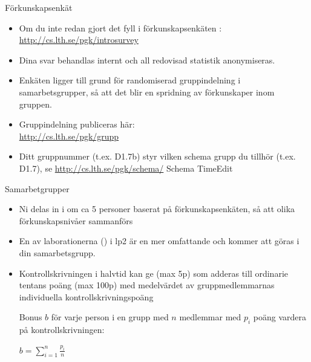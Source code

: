 \begin{SlideExtra}{Förkunskapsenkät}
\begin{itemize}
\item Om du inte redan gjort det fyll i förkunskapsenkäten :
\url{http://cs.lth.se/pgk/introsurvey}
\item Dina svar behandlas internt och all redovisad statistik anonymiseras.
\item Enkäten ligger till grund för randomiserad gruppindelning i samarbetsgrupper, så att det blir en spridning av förkunskaper inom gruppen.
\item Gruppindelning publiceras här: \\ \url{http://cs.lth.se/pgk/grupp}
\item Ditt gruppnummer (t.ex. D1.7b) styr vilken schema grupp du tillhör (t.ex. D1.7), se \url{http://cs.lth.se/pgk/schema/} Schema TimeEdit
\end{itemize}
\end{SlideExtra}

\begin{SlideExtra}{Samarbetgrupper}\footnotesize
\begin{itemize}
\item Ni delas in i  om ca 5 personer baserat på förkunskapsenkäten, så att olika förkunskapsnivåer sammanförs
\item En av laborationerna () i lp2 är en mer omfattande  och kommer att göras i din samarbetsgrupp. \\ \vspace{1em}
\item Kontrollskrivningen i halvtid kan ge  (max 5p) som adderas till ordinarie tentans poäng (max 100p) med medelvärdet av gruppmedlemmarnas individuella kontrollskrivningspoäng
\scriptsize \parbox{7cm}{Bonus $b$ för varje person i en grupp med $n$ medlemmar med $p_i$ poäng vardera på kontrollskrivningen:}
 \hspace{5mm} $\displaystyle b = \sum\limits_{i=1}^n \frac{p_i}{n}$
\end{itemize}
\end{SlideExtra}



